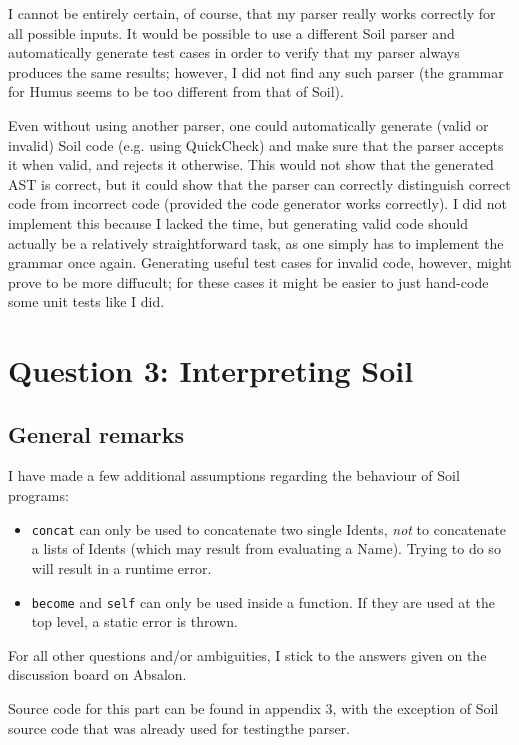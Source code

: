 \documentclass[a4paper]{article}
\begin{document}
I cannot be entirely certain, of course, that my parser really works correctly for all possible inputs. It would be possible to use a different Soil parser and automatically generate test cases in order to verify that my parser always produces the same results; however, I did not find any such parser (the grammar for Humus seems to be too different from that of Soil). 

Even without using another parser, one could automatically generate (valid or invalid) Soil code (e.g. using QuickCheck) and make sure that the parser accepts it when valid, and rejects it otherwise. This would not show that the generated AST is correct, but it could show that the parser can correctly distinguish correct code from incorrect code (provided the code generator works correctly). I did not implement this because I lacked the time, but generating valid code should actually be a relatively straightforward task, as one simply has to implement the grammar once again. Generating useful test cases for invalid code, however, might prove to be more diffucult; for these cases it might be easier to just hand-code some unit tests like I did.

\section*{Question 3: Interpreting Soil}

\subsection*{General remarks}
I have made a few additional assumptions regarding the behaviour of Soil programs:
\begin{itemize}
  \item \texttt{concat} can only be used to concatenate two single Idents, \emph{not} to concatenate a lists of Idents (which may result from evaluating a Name). Trying to do so will result in a runtime error.
  \item \texttt{become} and \texttt{self} can only be used inside a function. If they are used at the top level, a static error is thrown.
\end{itemize}

For all other questions and/or ambiguities, I stick to the answers given on the discussion board on Absalon.

Source code for this part can be found in appendix 3, with the exception of Soil source code that was already used for testingthe parser.
\end{document}
